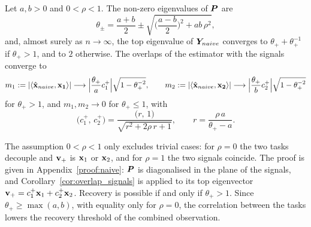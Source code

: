 \begin{prop}\label{prop:naive}
Let $a, b > 0$ and $0 < \rho < 1$. The non-zero eigenvalues of $\bm{P}$ are
\begin{equation}
    \theta_\pm = \frac{a+b}{2} \pm \sqrt{\Big(\frac{a-b}{2}\Big)^2 + ab\,\rho^2} ,
    \label{eq:eigenvalue_naive}
\end{equation}
and, almost surely as $n\to\infty$, the top eigenvalue of $\bm{Y}_{naive}$ converges to $\theta_+ + \theta_+^{-1}$ if $\theta_+ > 1$, and to $2$ otherwise. The overlaps of the estimator with the signals converge to
\begin{equation}
    m_1 := |\langle \hat{\boldsymbol{\mathbf{x}}}_{naive}, \boldsymbol{\mathbf{x_1}}\rangle| \longrightarrow \Big \lvert \frac{\theta_+}{a}c_1^+ \Big \rvert \sqrt{1-\theta_+^{-2}} ,
    \qquad
    m_2 := |\langle \hat{\boldsymbol{\mathbf{x}}}_{naive}, \boldsymbol{\mathbf{x_2}}\rangle| \longrightarrow \Big \lvert  \frac{\theta_+}{b}c_2^+  \Big \rvert \sqrt{1-\theta_+^{-2}}
    \label{eq:overlap_naive}
\end{equation}
for $\theta_+ > 1$, and $m_1, m_2 \to 0$ for $\theta_+ \le 1$, with
\[
    \big(c_1^+,\, c_2^+\big) = \frac{\big(r,\, 1\big)}{\sqrt{r^2 + 2\rho\, r + 1}},
    \qquad
    r = \frac{\rho\, a}{\theta_+ - a} .
\]
\end{prop}
\noindent
The assumption $0 < \rho < 1$ only excludes trivial cases: for $\rho = 0$ the two tasks decouple and $\boldsymbol{\mathbf{v}}_+$ is $\boldsymbol{\mathbf{x}}_1$ or $\boldsymbol{\mathbf{x}}_2$, and for $\rho = 1$ the two signals coincide.
The proof is given in Appendix~\ref{proof:naive}: $\bm{P}$ is diagonalised in the plane of the signals, and Corollary~\ref{cor:overlap_signals} is applied to its top eigenvector $\boldsymbol{\mathbf{v}}_+ = c_1^+\boldsymbol{\mathbf{x}}_1 + c_2^+\boldsymbol{\mathbf{x}}_2$. Recovery is possible if and only if $\theta_+ > 1$. Since $\theta_+ \ge \max(a, b)$, with equality only for $\rho = 0$, the correlation between the tasks lowers the recovery threshold of the combined observation.
